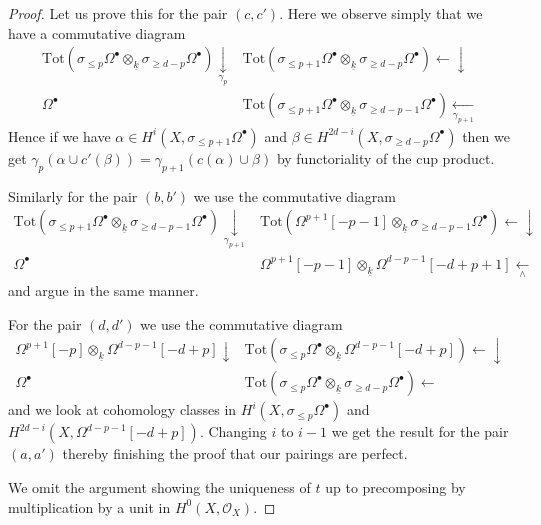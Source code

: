 \begin{proof}
\medskip\noindent
Let us prove this for the pair $(c, c')$. Here we observe simply
that we have a commutative diagram
$$
\begin{array}{cc}\text{Tot}(\sigma_{\leq p} \Omega^\bullet \otimes_{\underline{k}}
\sigma_{\geq d - p} \Omega^\bullet) \underset{\gamma_p}{\downarrow} & \text{Tot}(\sigma_{\leq p + 1} \Omega^\bullet \otimes_{\underline{k}}
\sigma_{\geq d - p} \Omega^\bullet) \longleftarrow\downarrow \\ \Omega^\bullet & \text{Tot}(\sigma_{\leq p + 1} \Omega^\bullet \otimes_{\underline{k}}
\sigma_{\geq d - p - 1} \Omega^\bullet) \underset{\gamma_{p + 1}}{\longleftarrow}\end{array}
$$
Hence if we have $\alpha \in H^i(X, \sigma_{\leq p + 1}\Omega^\bullet)$
and $\beta \in H^{2d - i}(X, \sigma_{\geq d - p}\Omega^\bullet)$
then we get
$\gamma_p(\alpha \cup c'(\beta)) = \gamma_{p + 1}(c(\alpha) \cup \beta)$
by functoriality of the cup product.

\medskip\noindent
Similarly for the pair $(b, b')$ we use the commutative diagram
$$
\begin{array}{cc}\text{Tot}(\sigma_{\leq p + 1} \Omega^\bullet \otimes_{\underline{k}}
\sigma_{\geq d - p - 1} \Omega^\bullet) \underset{\gamma_{p + 1}}{\downarrow} & \text{Tot}(\Omega^{p + 1}[-p - 1] \otimes_{\underline{k}}
\sigma_{\geq d - p - 1} \Omega^\bullet) \longleftarrow\downarrow \\ \Omega^\bullet & \Omega^{p + 1}[-p - 1]
\otimes_{\underline{k}}
\Omega^{d - p - 1}[-d + p + 1] \underset{\wedge}{\longleftarrow}\end{array}
$$
and argue in the same manner.

\medskip\noindent
For the pair $(d, d')$ we use the commutative diagram
$$
\begin{array}{cc}\Omega^{p + 1}[-p] \otimes_{\underline{k}}
\Omega^{d - p - 1}[-d + p] \downarrow & \text{Tot}(\sigma_{\leq p}\Omega^\bullet \otimes_{\underline{k}}
\Omega^{d - p - 1}[-d + p]) \longleftarrow\downarrow \\ \Omega^\bullet & \text{Tot}(\sigma_{\leq p}\Omega^\bullet \otimes_{\underline{k}}
\sigma_{\geq d - p}\Omega^\bullet) \longleftarrow\end{array}
$$
and we look at cohomology classes in
$H^i(X, \sigma_{\leq p}\Omega^\bullet)$ and
$H^{2d - i}(X, \Omega^{d - p - 1}[-d + p])$.
Changing $i$ to $i - 1$ we get the result for the pair $(a, a')$
thereby finishing the proof that our pairings are perfect.

\medskip\noindent
We omit the argument showing the uniqueness of $t$ up to
precomposing by multiplication by a unit in $H^0(X, \mathcal{O}_X)$.
\end{proof}

